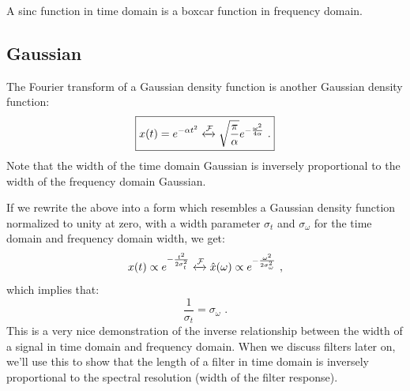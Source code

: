 \begin{marginfigure}
\begin{center}

\end{center}
\caption{A sinc function in time domain is a boxcar function in frequency domain.}
\end{marginfigure}

\subsection{Gaussian}
The Fourier transform of a Gaussian density function is another Gaussian density function:
\begin{equation}
\boxed{x(t) = e^{-\alpha t^2} \xleftrightarrow{\mathcal{F}} \sqrt{\frac{\pi}{\alpha}} e^{-\frac{\omega^2}{4\alpha}}\,\,.}
\end{equation} 
Note that the width of the time domain Gaussian is inversely proportional to the width of the frequency domain Gaussian.

If we rewrite the above into a form which resembles a Gaussian density function normalized to unity at zero, with a width parameter $\sigma_t$ and $\sigma_\omega$ for the time domain and frequency domain width, we get:
\begin{equation}
x(t) \propto e^{-\frac{t^2}{2\sigma_t^2}} \xleftrightarrow{\mathcal{F}} \hat{x}(\omega) \propto e^{-\frac{\omega^2}{2\sigma_\omega^2}}\,\,,
\end{equation}
which implies that:
\begin{equation}
\frac{1}{\sigma_t} = \sigma_\omega\,\,.
\end{equation}%
This is a very nice demonstration of the inverse relationship between the width of a signal in time domain and frequency domain. 
When we discuss filters later on, we'll use this to show that the length of a filter in time domain is inversely proportional to the spectral resolution (width of the filter response).


